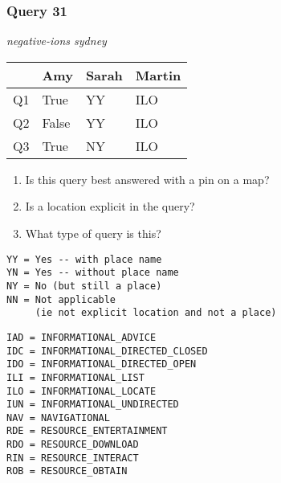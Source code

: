 \begin{frame}[fragile]
\frametitle{Query 31}
\vspace{1em}

\emph{negative-ions sydney}

\vfill

\begin{table}
  \centering
  \begin{tabular}{ l l l l }
    & \textbf{Amy} & \textbf{Sarah} & \textbf{Martin}\\
    \toprule
    Q1 & True & YY & ILO\\
Q2 & False & YY & ILO\\
Q3 & True & NY & ILO\\
    \bottomrule
  \end{tabular}
\end{table}

\vfill

\tiny{

\begin{enumerate}
\item Is this query best answered with a pin on a map?
\item Is a location explicit in the query?
\item What type of query is this?
\end{enumerate}

\vfill

\begin{multicols}{2}
\begin{verbatim}
YY = Yes -- with place name
YN = Yes -- without place name
NY = No (but still a place)
NN = Not applicable 
     (ie not explicit location and not a place)
\end{verbatim}

\columnbreak
\begin{verbatim}
IAD = INFORMATIONAL_ADVICE
IDC = INFORMATIONAL_DIRECTED_CLOSED
IDO = INFORMATIONAL_DIRECTED_OPEN
ILI = INFORMATIONAL_LIST
ILO = INFORMATIONAL_LOCATE
IUN = INFORMATIONAL_UNDIRECTED
NAV = NAVIGATIONAL
RDE = RESOURCE_ENTERTAINMENT
RDO = RESOURCE_DOWNLOAD
RIN = RESOURCE_INTERACT
ROB = RESOURCE_OBTAIN
\end{verbatim}
\end{multicols}
}

\end{frame}


